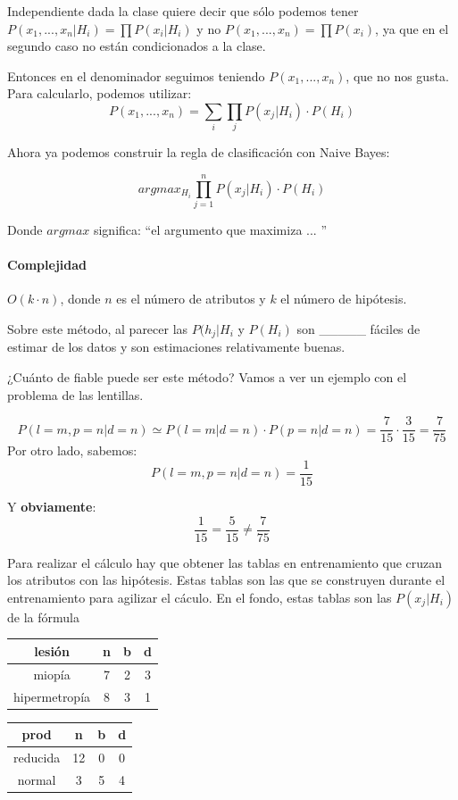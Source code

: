 \documentclass{apuntes}
\begin{document}
Independiente dada la clase quiere decir que sólo podemos tener
$P(x_1,...,x_n | H_i) = \prod{P(x_i | H_i)}$ y no $P(x_1,...,x_n) = \prod{P(x_i)}$, ya que en el segundo caso no están condicionados a la clase.

Entonces en el denominador seguimos teniendo $P(x_1,...,x_n)$, que no nos gusta. Para calcularlo, podemos utilizar:
\[
P(x_1,...,x_n) = \sum_i \prod_j P(x_j | H_i) · P(H_i)
\]

Ahora ya podemos construir la regla de clasificación con Naive Bayes:

\begin{defn}
\begin{mdframed}
	\[
		argmax_{H_i} \prod_{j=1}^n P(x_j|H_i) · P(H_i)
	\]
\end{mdframed}
Donde $argmax$ significa: ``el argumento que maximiza ... ''

\paragraph{Complejidad} $O(k·n)$, donde $n$ es el número de atributos y $k$ el número de hipótesis.


Sobre este método, al parecer las $P(h_j|H_i$ y $P(H_i)$ son \_\_\_\_\_ fáciles de estimar de los datos y son estimaciones relativamente buenas.
\end{defn}

\begin{example}
¿Cuánto de fiable puede ser este método? Vamos a ver un ejemplo con el problema de las lentillas.

\[
P(l=m,p=n | d=n) \simeq P(l=m | d=n) · P(p=n | d=n) = \frac{7}{15}·\frac{3}{15} = \frac{7}{75}
\]
Por otro lado, sabemos:
\[
P(l=m,p=n | d=n) = \frac{1}{15}
\]

Y \textbf{obviamente}: \[\frac{1}{15} = \frac{5}{15} ≠ \frac{7}{75}\]

\end{example}



Para realizar el cálculo hay que obtener las tablas en entrenamiento que cruzan los atributos con las hipótesis. Estas tablas son las que se construyen durante el entrenamiento para agilizar el cáculo. En el fondo, estas tablas son las $P(x_j|H_i)$ de la fórmula

\begin{center}

\begin{tabular}{|c|c|c|c|}
\hline
lesión & n&b&d\\\hline
miopía & 7&2&3\\\hline
hipermetropía & 8&3&1\\\hline
\end{tabular}
\;\;\;
\begin{tabular}{|c|c|c|c|}
\hline
prod & n&b&d\\\hline
reducida & 12 & 0 & 0\\\hline
normal &3&5&4\\\hline
\end{tabular}
\end{center}
\end{document}

